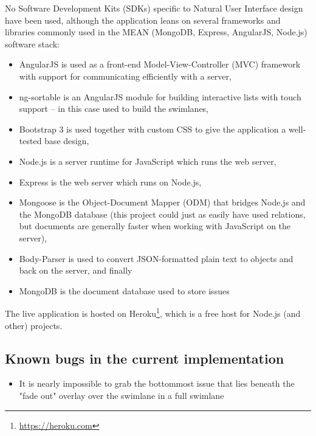 No Software Development Kits (SDKs) specific to Natural User Interface design have been used, although the application leans on several frameworks and libraries commonly used in the MEAN (MongoDB, Express, AngularJS, Node.js) software stack:

\begin{itemize}
  \item AngularJS is used as a front-end Model-View-Controller (MVC) framework with support for communicating efficiently with a server,
  \item ng-sortable is an AngularJS module for building interactive lists with touch support -- in this case used to build the swimlanes,
  \item Bootstrap 3 is used together with custom CSS to give the application a well-tested base design,
  \item Node.js is a server runtime for JavaScript which runs the web server,
  \item Express is the web server which runs on Node.js,
  \item Mongoose is the Object-Document Mapper (ODM) that bridges Node.js and the MongoDB database (this project could just as easily have used relations, but documents are generally faster when working with JavaScript on the server),
  \item Body-Parser is used to convert JSON-formatted plain text to objects and back on the server, and finally
  \item MongoDB is the document database used to store issues
\end{itemize}

The live application is hosted on Heroku\footnote{\url{https://heroku.com}}, which is a free host for Node.js (and other) projects.

\subsection{Known bugs in the current implementation}

\begin{itemize}
  \item It is nearly impossible to grab the bottommost issue that lies beneath the "fade out" overlay over the swimlane in a full swimlane
\end{itemize}
